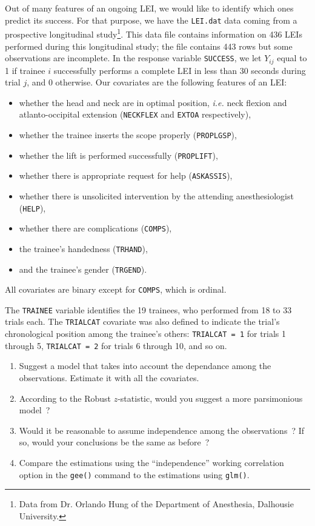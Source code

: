 \documentclass[a4paper,12pt]{article}\usepackage[]{graphicx}\usepackage[]{color}
\begin{document}
Out of many features of an ongoing LEI, we would like to identify which ones predict its success. For that purpose, we have the \texttt{LEI.dat} data coming from a prospective longitudinal study\footnote{Data from Dr. Orlando Hung of the Department of Anesthesia, Dalhousie University.}. This data file contains information on 436 LEIs performed during this longitudinal study; the file contains 443 rows but some observations are incomplete. In the response variable \texttt{SUCCESS}, we let $Y_{ij}$ equal to 1 if trainee $i$ successfully performs a complete LEI in less than 30 seconds during trial $j$, and 0 otherwise. Our covariates are the following features of an LEI:
\begin{itemize}
\item{whether the head and neck are in optimal position, \emph{i.e.} neck flexion and atlanto-occipital extension (\texttt{NECKFLEX} and \texttt{EXTOA} respectively),}
\item{whether the trainee inserts the scope properly (\texttt{PROPLGSP}),}
\item{whether the lift is performed successfully (\texttt{PROPLIFT}),}
\item{whether there is appropriate request for help (\texttt{ASKASSIS}),}
\item{whether there is unsolicited intervention by the attending anesthesiologist (\texttt{HELP}),}
\item{whether there are complications (\texttt{COMPS}),}
\item{the trainee's handedness (\texttt{TRHAND}),}
\item{and the trainee's gender (\texttt{TRGEND}).}
\end{itemize}
All covariates are binary except for \texttt{COMPS}, which is ordinal.

The \texttt{TRAINEE} variable identifies the 19 trainees, who performed from 18 to 33 trials each. The \texttt{TRIALCAT} covariate was also defined to indicate the trial's chronological position among the trainee's others: \texttt{TRIALCAT = 1} for trials 1 through 5, \texttt{TRIALCAT = 2} for trials 6 through 10, and so on.

\begin{enumerate}
\item{Suggest a model that takes into account the dependance among the observations. Estimate it with all the covariates.}
\item{According to the Robust $z$-statistic, would you suggest a more parsimonious model~?}
\item{Would it be reasonable to assume independence among the observations~? If so, would your conclusions be the same as before~?}
\item{Compare the estimations using the ``independence'' working correlation option in the \verb"gee()" command to the estimations using \verb"glm()".}
\end{enumerate}
\end{document}
